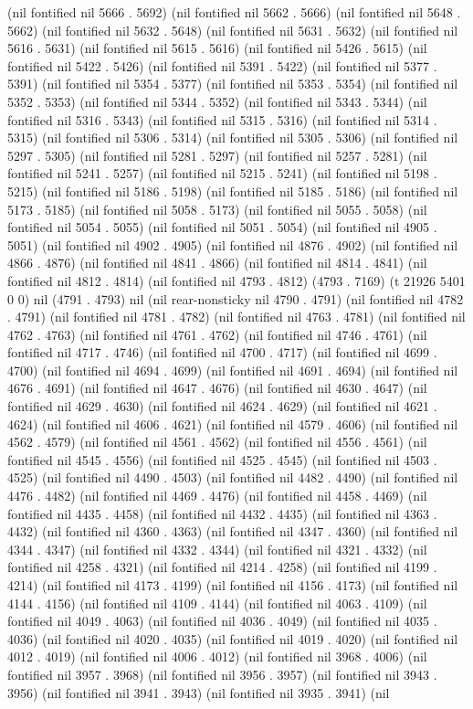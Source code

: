 (nil fontified nil 5666 . 5692) (nil fontified nil 5662 . 5666) (nil fontified nil 5648 . 5662) (nil fontified nil 5632 . 5648) (nil fontified nil 5631 . 5632) (nil fontified nil 5616 . 5631) (nil fontified nil 5615 . 5616) (nil fontified nil 5426 . 5615) (nil fontified nil 5422 . 5426) (nil fontified nil 5391 . 5422) (nil fontified nil 5377 . 5391) (nil fontified nil 5354 . 5377) (nil fontified nil 5353 . 5354) (nil fontified nil 5352 . 5353) (nil fontified nil 5344 . 5352) (nil fontified nil 5343 . 5344) (nil fontified nil 5316 . 5343) (nil fontified nil 5315 . 5316) (nil fontified nil 5314 . 5315) (nil fontified nil 5306 . 5314) (nil fontified nil 5305 . 5306) (nil fontified nil 5297 . 5305) (nil fontified nil 5281 . 5297) (nil fontified nil 5257 . 5281) (nil fontified nil 5241 . 5257) (nil fontified nil 5215 . 5241) (nil fontified nil 5198 . 5215) (nil fontified nil 5186 . 5198) (nil fontified nil 5185 . 5186) (nil fontified nil 5173 . 5185) (nil fontified nil 5058 . 5173) (nil fontified nil 5055 . 5058) (nil fontified nil 5054 . 5055) (nil fontified nil 5051 . 5054) (nil fontified nil 4905 . 5051) (nil fontified nil 4902 . 4905) (nil fontified nil 4876 . 4902) (nil fontified nil 4866 . 4876) (nil fontified nil 4841 . 4866) (nil fontified nil 4814 . 4841) (nil fontified nil 4812 . 4814) (nil fontified nil 4793 . 4812) (4793 . 7169) (t 21926 5401 0 0) nil (4791 . 4793) nil (nil rear-nonsticky nil 4790 . 4791) (nil fontified nil 4782 . 4791) (nil fontified nil 4781 . 4782) (nil fontified nil 4763 . 4781) (nil fontified nil 4762 . 4763) (nil fontified nil 4761 . 4762) (nil fontified nil 4746 . 4761) (nil fontified nil 4717 . 4746) (nil fontified nil 4700 . 4717) (nil fontified nil 4699 . 4700) (nil fontified nil 4694 . 4699) (nil fontified nil 4691 . 4694) (nil fontified nil 4676 . 4691) (nil fontified nil 4647 . 4676) (nil fontified nil 4630 . 4647) (nil fontified nil 4629 . 4630) (nil fontified nil 4624 . 4629) (nil fontified nil 4621 . 4624) (nil fontified nil 4606 . 4621) (nil fontified nil 4579 . 4606) (nil fontified nil 4562 . 4579) (nil fontified nil 4561 . 4562) (nil fontified nil 4556 . 4561) (nil fontified nil 4545 . 4556) (nil fontified nil 4525 . 4545) (nil fontified nil 4503 . 4525) (nil fontified nil 4490 . 4503) (nil fontified nil 4482 . 4490) (nil fontified nil 4476 . 4482) (nil fontified nil 4469 . 4476) (nil fontified nil 4458 . 4469) (nil fontified nil 4435 . 4458) (nil fontified nil 4432 . 4435) (nil fontified nil 4363 . 4432) (nil fontified nil 4360 . 4363) (nil fontified nil 4347 . 4360) (nil fontified nil 4344 . 4347) (nil fontified nil 4332 . 4344) (nil fontified nil 4321 . 4332) (nil fontified nil 4258 . 4321) (nil fontified nil 4214 . 4258) (nil fontified nil 4199 . 4214) (nil fontified nil 4173 . 4199) (nil fontified nil 4156 . 4173) (nil fontified nil 4144 . 4156) (nil fontified nil 4109 . 4144) (nil fontified nil 4063 . 4109) (nil fontified nil 4049 . 4063) (nil fontified nil 4036 . 4049) (nil fontified nil 4035 . 4036) (nil fontified nil 4020 . 4035) (nil fontified nil 4019 . 4020) (nil fontified nil 4012 . 4019) (nil fontified nil 4006 . 4012) (nil fontified nil 3968 . 4006) (nil fontified nil 3957 . 3968) (nil fontified nil 3956 . 3957) (nil fontified nil 3943 . 3956) (nil fontified nil 3941 . 3943) (nil fontified nil 3935 . 3941) (nil 